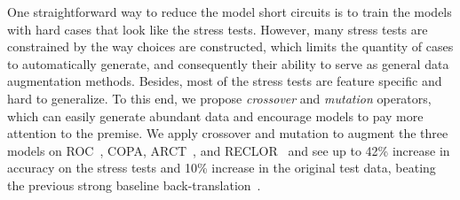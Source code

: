 

One straightforward way to 
reduce the model short circuits is to train
the models with hard cases that look like the stress tests. 
However, many stress tests are constrained by the way choices
are constructed, which limits the quantity of cases to automatically generate, 
and consequently their ability to serve as general 
data augmentation methods. Besides, most of the stress tests are feature specific 
and hard to generalize.
To this end, we propose \textit{crossover} and 
\textit{mutation} operators, which can easily generate abundant data and 
encourage models to pay more attention to the premise. 
We apply crossover and mutation 
to augment the three models on ROC~\cite{roc2017}, COPA, 
ARCT~\cite{arct2018}, and RECLOR~\cite{yu2020reclor} and see 
up to 42\% increase in accuracy on the stress tests and 10\% increase in
the original test data, beating the previous strong baseline
back-translation~\cite{back2019}.

